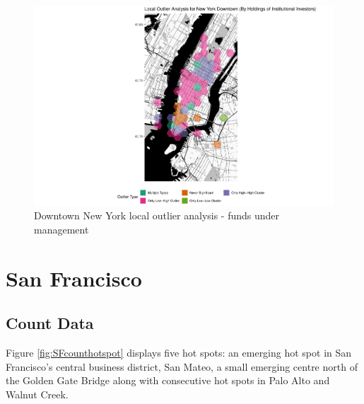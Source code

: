 \begin{figure}
	\centering
	\includegraphics[width=1\linewidth]{Figures/ChapterIV/NY_Money_LO_Downtown}
	\caption[Downtown New York Local Outlier Analysis - Funds Under Management 2013-2018]{Downtown New York local outlier analysis - funds under management}
	\label{fig:NYClocaloutlier_Downtown}
\end{figure}


\section{San Francisco}


\subsection{Count Data}

Figure \ref{fig:SFcounthotspot} displays five hot spots: an emerging hot spot in San Francisco's central business district, San Mateo, a small emerging centre north of the Golden Gate Bridge along with consecutive hot spots in Palo Alto and Walnut Creek.   


